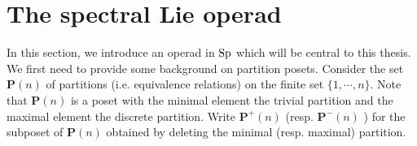 %
%
%
%
\section{The spectral Lie operad}
In this section, we introduce an operad in $\operatorname{Sp}$ which will be central to this thesis. 
We first need to provide some background on partition posets. 
Consider the set $\mathbf{P}(n)$ of partitions (i.e. equivalence relations) on the finite set $\{1, \cdots, n \}$. Note that $\mathbf{P}(n)$ is a poset with the minimal element the trivial partition and the maximal element the discrete partition.
Write $\mathbf{P}^{+}(n)$ (resp. $\mathbf{P}^{-}(n)$ ) for the subposet of $\mathbf{P}(n)$ obtained by deleting the minimal (resp. maximal) partition.

